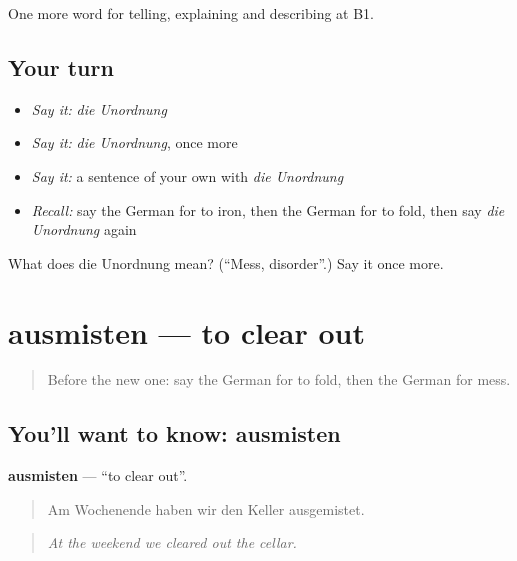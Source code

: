 \begin{grammarlens}[title={What you've built}]
One more word for telling, explaining and describing at B1.
\end{grammarlens}

\subsection*{Your turn}
\begin{itemize}
\raggedright
  \item \emph{Say it:} \emph{die Unordnung}
  \item \emph{Say it:} \emph{die Unordnung}, once more
  \item \emph{Say it:} a sentence of your own with \emph{die Unordnung}
  \item \emph{Recall:} say the German for to iron, then the German for to fold, then say \emph{die Unordnung} again
\end{itemize}

\begin{tcolorbox}[breakable,colback=teal!4,colframe=teal!35!black,title={Before you move on}]
What does die Unordnung mean? (\textquotedblleft{}Mess, disorder\textquotedblright{}.) Say it once more.
\end{tcolorbox}
\section[ausmisten]{ausmisten — to clear out}

\label{lesson:GE-C528-ausmisten}



\begin{quote}
Before the new one: say the German for to fold, then the German for mess.
\end{quote}

\subsection*{You'll want to know: ausmisten}
\textbf{ausmisten} — \textquotedblleft{}to clear out\textquotedblright{}.

\begin{quote}
Am Wochenende haben wir den Keller ausgemistet.
\end{quote}

\begin{quote}
\emph{At the weekend we cleared out the cellar.}
\end{quote}

